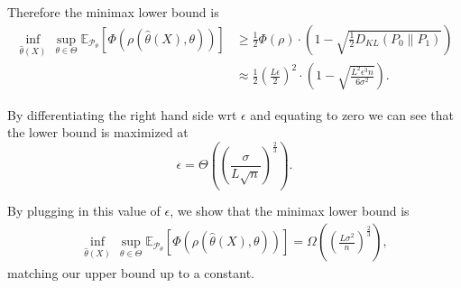 \documentclass{article}
\newcommand{\Pd}{\mathcal{P}}
\newcommand{\Ev}{\mathbb{E}}
\begin{document}
	Therefore the minimax lower bound is 
	\begin{align*}
	\inf_{\hat\theta(X)} \, \sup_{\theta \in \Theta} \Ev_{\Pd_\theta} \left[ \Phi(\rho(\hat\theta(X),\theta))\right]
	& \geq \frac{1}{2}\Phi(\rho) \cdot \left(1 - \sqrt{\frac{1}{2}D_{KL}(P_0\|P_1)}\right) \\ 
	& \approx \frac{1}{2}\left(\frac{L\epsilon}{2}\right)^2 \cdot \left(1 - \sqrt{\frac{L^2\epsilon^3 n}{6\sigma^2}}\right).
	\end{align*}
	
	By differentiating the right hand side wrt $\epsilon$ and equating to zero we can see that the lower bound is maximized at 
	\[
	\epsilon = \Theta\left( \left(\frac{\sigma}{L\sqrt{n}}\right)^{\frac{2}{3}} \right).
	\]
	
	By plugging in this value of $\epsilon$, we show that the minimax lower bound is
	\begin{align*}
	\inf_{\hat\theta(X)} \, \sup_{\theta \in \Theta} \Ev_{\Pd_\theta} \left[ \Phi(\rho(\hat\theta(X),\theta))\right] = \Omega\left( \left(\frac{L \sigma^2}{n}\right)^{\frac{2}{3}} \right),
	\end{align*}
	matching our upper bound up to a constant.
\end{document}
